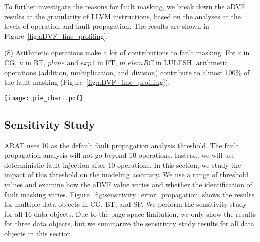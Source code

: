 To further investigate the reasons for fault masking, 
we break down the aDVF results at the granularity of LLVM instructions,
based on the analyses at the levels of operation and fault propagation.
The results are shown in Figure~\ref{fig:aDVF_fine_profiling}.

(8) Arithmetic operations make a lot of contributions to fault masking.
For $r$ in CG, $u$ in BT, $plane$ and $exp1$ in FT, $m\_elemBC$ in LULESH, 
arithmetic operations (addition, multiplication, and division) contribute to almost 100\% of the fault masking (Figure~\ref{fig:aDVF_fine_profiling}).  

\begin{figure*}
	\centering
	\texttt{[image: pie\_chart.pdf]}
	\vspace{-10pt}
	\caption{Breakdown of the aDVF results based on the analyses at the levels of operation and fault propagation}
    \vspace{-10pt}
	\label{fig:aDVF_fine_profiling}
\end{figure*}


\subsection{Sensitivity Study}
\label{sec:eval_sen}
ARAT uses 10 as the default fault propagation analysis threshold. 
The fault propagation analysis will not go beyond 10 operations. Instead,
we will use deterministic fault injection after 10 operations. 
In this section, we study the impact of this threshold on the modeling accuracy. We use a range of threshold values and examine how the aDVF value varies and whether
the identification of fault masking varies. 
Figure~\ref{fig:sensitivity_error_propagation} shows the results for 
multiple data objects in CG, BT, and SP.
We perform the sensitivity study for all 16 data objects.
Due to the page space limitation, we only show the results for three data objects,
but we summarize the sensitivity study results for all data objects in this section.

